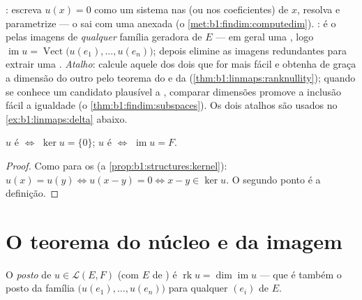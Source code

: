 \begin{method}
\label{met:b1:linmaps:kerim}
\emph{}: escreva $u(x) = 0$ como um sistema nas 
(ou nos coeficientes) de $x$, resolva e parametrize --- o 
sai com uma  anexada (o \cref{met:b1:findim:computedim}). \emph{}: é o  pelas imagens de \emph{qualquer} família geradora de $E$ ---
em geral uma , logo $\operatorname{im} u =
\operatorname{Vect}\bigl(u(e_1), \dots, u(e_n)\bigr)$; depois elimine as imagens
redundantes para extrair uma . \emph{Atalho}: calcule aquele
dos dois que for mais fácil e obtenha de graça a dimensão do outro
pelo teorema do  e da  (\cref{thm:b1:linmaps:ranknullity}); quando se conhece um
candidato plausível a  , comparar dimensões promove
a inclusão fácil a igualdade (o \cref{thm:b1:findim:subspaces}). Os dois atalhos são usados
no \cref{ex:b1:linmaps:delta} abaixo.
\end{method}

\begin{proposition}\label{prop:b1:linmaps:kernel}
$u$ é  $\iff$ $\ker u = \{0\}$; $u$ é  $\iff$ $\operatorname{im} u = F$.
\end{proposition}

\begin{proof}
Como para os  (a \cref{prop:b1:structures:kernel}): $u(x) = u(y) \iff
u(x - y) = 0 \iff x - y \in \ker u$. O segundo ponto é a
definição.
\end{proof}

\section{O teorema do núcleo e da imagem}

\begin{definition}\label{def:b1:linmaps:rank}
O \emph{posto} de $u \in \mathcal{L}(E,
F)$ (com
$E$ de ) é $\operatorname{rk} u = \dim
\operatorname{im} u$ --- que é também o posto da família
$\bigl(u(e_1), \dots, u(e_n)\bigr)$ para qualquer  $(e_i)$ de $E$.
\end{definition}

